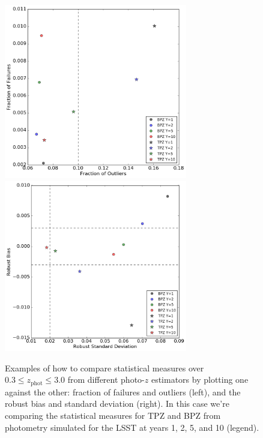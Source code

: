 \documentclass[DM,lsstdraft,toc]{lsstdoc}
\begin{document}
\begin{figure}
\begin{center}
\includegraphics[width=8cm]{figures/stat_stat_fout_ffail.png}
\includegraphics[width=8cm]{figures/stat_stat_std_bias.png}
\caption{Examples of how to compare statistical measures over $0.3 \leq z_\mathrm{phot} \leq 3.0$ from different photo-$z$ estimators by plotting one against the other: fraction of failures and outliers (left), and the robust bias and standard deviation (right). In this case we're comparing the statistical measures for TPZ and BPZ from photometry simulated for the LSST at years 1, 2, 5, and 10 (legend).  \label{fig:stat_stat}}
\end{center}
\end{figure}
\end{document}
